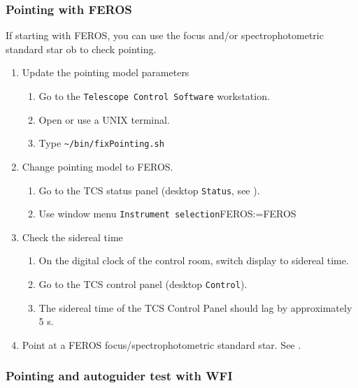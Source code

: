 \documentclass[11pt,fleqn,a4paper]{book}
\makeatletter
\def\menu#1#2{\texttt{#1}\ifx{}#2\else\@for\@x:=#2\do{$\rightarrow$\texttt{\@x}}\fi}
\def\wmenu#1#2{window menu \menu{#1}{#2}}
\def\home{\textasciitilde{}}
\makeatother
\begin{document}
\subsubsection{Pointing with FEROS}

If starting with FEROS, you can use the \gls{focus} and/or \gls{spectrophotometric standard} star \gls{ob} to check \gls{pointing}.

\begin{enumerate}
  \item Update the \gls{pointing model} parameters
  \begin{enumerate}
     \item Go to the \texttt{Telescope Control Software} workstation.
     \item Open or use a UNIX terminal.
     \item Type \texttt{\home/bin/fixPointing.sh}
  \end{enumerate}
  \item Change \gls{pointing model} to FEROS.
  \begin{enumerate}
    \item Go to the \gls{TCS status panel} (\gls{desktop} \texttt{Status}, see ).
    \item Use \wmenu{Instrument selection}{FEROS}
  \end{enumerate}
  \item Check the sidereal time
  \begin{enumerate}
    \item On the digital clock of the \gls{control room}, switch display to sidereal time.
    \item Go to the \gls{TCS control panel} (\gls{desktop} \texttt{Control}).
    \item The sidereal time of the TCS Control Panel should lag by approximately 5 s. 
  \end{enumerate}
  \item Point at a FEROS \gls{focus}/\gls{spectrophotometric standard} star. See .
\end{enumerate}

\subsubsection{Pointing and autoguider test with WFI}
\end{document}
